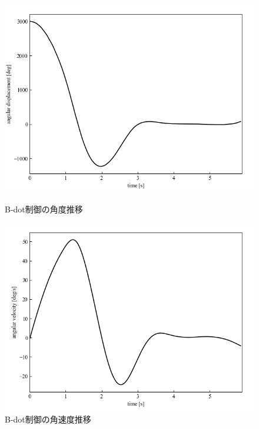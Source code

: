 \begin{figure}[h]
	\centering
	\begin{minipage}{0.43\columnwidth}
	  \centering
	  \includegraphics[width=\columnwidth]{./figure/crossdeg.png}
	  \caption{B-dot制御の角度推移}
	  \label{fig:crossdeg}
	\end{minipage}
	\hspace{5mm}
	\begin{minipage}{0.43\columnwidth}
	  \centering
	  \includegraphics[width=\columnwidth]{./figure/crossdegpers.png}
	  \caption{B-dot制御の角速度推移}
	  \label{fig:crossdegpers}
	\end{minipage}
\end{figure}


